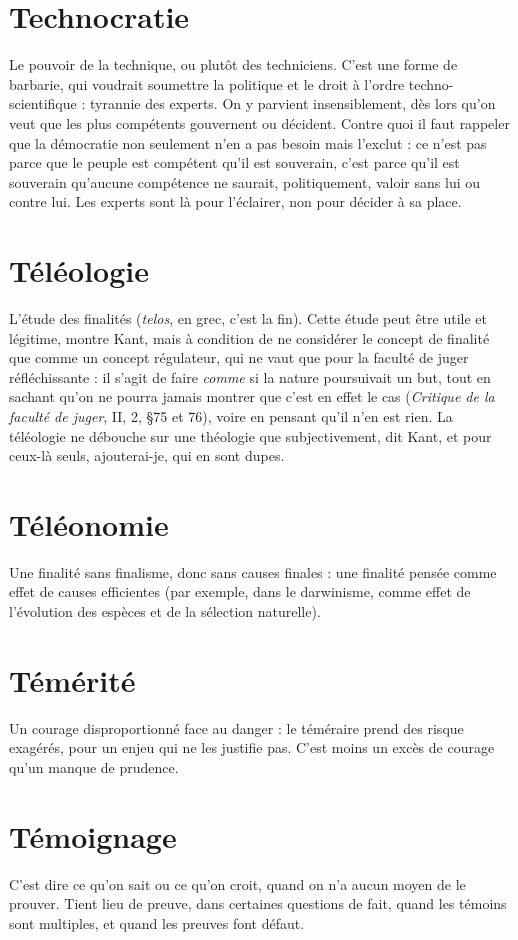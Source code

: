 \section{Technocratie}
Le pouvoir de la technique, ou plutôt des techniciens.
C’est une forme de barbarie, qui voudrait soumettre la
politique et le droit à l’ordre techno-scientifique : tyrannie des experts. On y
parvient insensiblement, dès lors qu’on veut que les plus compétents gouvernent
ou décident. Contre quoi il faut rappeler que la démocratie non seulement
n’en a pas besoin mais l’exclut : ce n’est pas parce que le peuple est compétent
qu’il est souverain, c’est parce qu’il est souverain qu'aucune compétence
ne saurait, politiquement, valoir sans lui ou contre lui. Les experts sont là pour
l'éclairer, non pour décider à sa place.

\section{Téléologie}
L'étude des finalités ({\it telos}, en grec, c’est la fin). Cette étude
peut être utile et légitime, montre Kant, mais à condition de
ne considérer le concept de finalité que comme un concept régulateur, qui ne
vaut que pour la faculté de juger réfléchissante : il s’agit de faire {\it comme} si la
nature poursuivait un but, tout en sachant qu’on ne pourra jamais montrer que
c’est en effet le cas ({\it Critique de la faculté de juger}, II, 2, \S 75 et 76), voire en
pensant qu’il n’en est rien. La téléologie ne débouche sur une théologie que
subjectivement, dit Kant, et pour ceux-là seuls, ajouterai-je, qui en sont dupes.

\section{Téléonomie}
Une finalité sans finalisme, donc sans causes finales : une
finalité pensée comme effet de causes efficientes (par
exemple, dans le darwinisme, comme effet de l’évolution des espèces et de la
sélection naturelle).

\section{Témérité}
Un courage disproportionné face au danger : le téméraire prend
des risque exagérés, pour un enjeu qui ne les justifie pas. C’est
moins un excès de courage qu’un manque de prudence.

\section{Témoignage}
C’est dire ce qu’on sait ou ce qu’on croit, quand on n’a
aucun moyen de le prouver. Tient lieu de preuve, dans certaines
questions de fait, quand les témoins sont multiples, et quand les preuves
font défaut.

